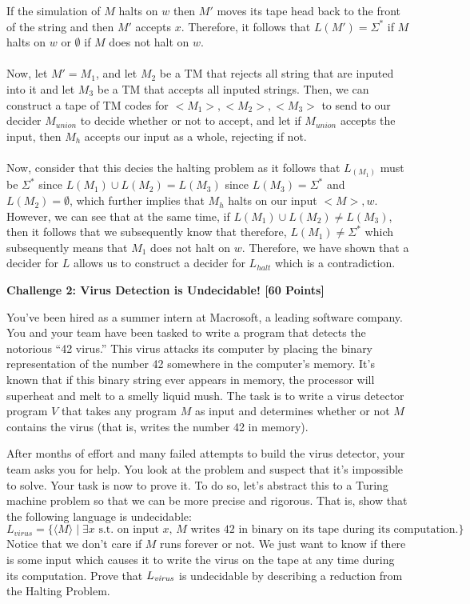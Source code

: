 \documentclass[12pt]{article}
\newcommand{\Problem}[3]{\mbox{} \newline \noindent \textbf{\textbf{Challenge #1: #2 [#3 Points] \\ }}}
\begin{document}
\begin{enumerate}
	If the simulation of $M$ halts on $w$ then $M'$ moves its tape head back to the front of the string and then $M'$ accepts $x$. Therefore, it follows that $L(M') = \Sigma^{*}$ if $M$ halts on $w$ or $\emptyset$ if $M$ does not halt on $w$.\\\\
	Now, let $M' = M_{1}$, and let $M_2$ be a TM that rejects all string that are inputed into it and let $M_3$ be a TM that accepts all inputed strings. Then, we can construct a tape of TM codes for $<M_1>, <M_2>, <M_3>$ to send to our decider $M_{union}$ to decide whether or not to accept, and let if $M_{union}$ accepts the input, then $M_{h}$ accepts our input as a whole, rejecting if not.\\\\
	Now, consider that this decies the halting problem as it follows that $L_(M_1)$ must be $\Sigma^{*}$ since $L(M_1) \cup L(M_2) = L(M_3)$ since $L(M_3) = \Sigma^{*}$ and $L(M_2) = \emptyset$, which further implies that $M_h$ halts on our input $<M>,w$. However, we can see that at the same time, if $L(M_1) \cup L(M_2) \neq L(M_3)$, then it follows that we subsequently know that therefore, $L(M_1) \neq \Sigma^{*}$ which subsequently means that $M_1$ does not halt on $w$. 
	Therefore, we have shown that a decider for $L$ allows us to construct a decider for $L_{halt}$ which is a contradiction.
\end{enumerate}

\Problem{2}{Virus Detection is Undecidable!}{60}

You've been hired as a summer intern at Macrosoft, a leading software company. You and your team have been tasked to write a program that detects the notorious ``42 virus.''  This virus attacks its computer by placing the binary representation of the number 42 somewhere in the computer's memory. It's known that if this binary string ever appears in memory, the processor will superheat and melt to a smelly liquid mush.  The task is to write a virus detector program $V$ that takes any program $M$ as input and determines whether or not $M$ contains the virus (that is, writes the number 42 in memory).

After months of effort and many failed attempts to build the virus detector, your team asks you for help. You look at the problem and suspect that it's impossible to solve. Your task is now to prove it.  To do so, let's abstract this to a Turing machine problem so that we can be more precise and rigorous. That is, show that the following language is undecidable:
\small
\[
    L_{virus} = \{ \langle M\rangle \mid \mbox{$\exists x$ s.t.\ on input $x$, $M$ writes 42 in binary on its tape during its computation.} \}
\]
\normalsize
Notice that we don't care if $M$ runs forever or not. We just want to know if there is some input which causes it to write the virus on the tape at any time during its computation. 
Prove that $L_\emph{virus}$ is undecidable by describing a reduction from the Halting Problem.
\end{document}
